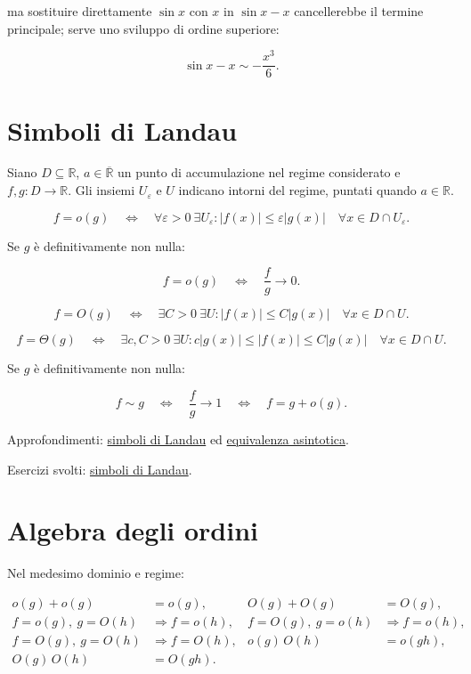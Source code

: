 ma sostituire direttamente \(\sin x\) con \(x\) in \(\sin x-x\) cancellerebbe il termine principale; serve uno sviluppo di ordine superiore:

\[
\sin x-x\sim-\frac{x^3}{6}.
\]

\section{Simboli di Landau}\label{simboli-di-landau}

Siano \(D\subseteq\mathbb R\), \(a\in\overline{\mathbb R}\) un punto di accumulazione nel regime considerato e \(f,g:D\to\mathbb R\). Gli insiemi \(U_\varepsilon\) e \(U\) indicano intorni del regime, puntati quando \(a\in\mathbb R\).

\[
\displaystyle
f=o(g)
\quad\Longleftrightarrow\quad
\forall\varepsilon>0\ \exists U_\varepsilon:
|f(x)|\le\varepsilon|g(x)|
\quad\forall x\in D\cap U_\varepsilon.
\]

Se \(g\) è definitivamente non nulla:

\[
\displaystyle
f=o(g)
\quad\Longleftrightarrow\quad
\frac{f}{g}\to0.
\]

\[
\displaystyle
f=O(g)
\quad\Longleftrightarrow\quad
\exists C>0\ \exists U:
|f(x)|\le C|g(x)|
\quad\forall x\in D\cap U.
\]

\[
\displaystyle
f=\Theta(g)
\quad\Longleftrightarrow\quad
\exists c,C>0\ \exists U:
c|g(x)|\le |f(x)|\le C|g(x)|
\quad\forall x\in D\cap U.
\]

Se \(g\) è definitivamente non nulla:

\[
\displaystyle
f\sim g
\quad\Longleftrightarrow\quad
\frac{f}{g}\to1
\quad\Longleftrightarrow\quad
f=g+o(g).
\]

Approfondimenti: \href{https://ingegnerismo.it/matematica/simboli-di-landau/}{simboli di Landau} ed \href{https://ingegnerismo.it/matematica/equivalenza-asintotica/}{equivalenza asintotica}.

Esercizi svolti: \href{https://ingegnerismo.it/matematica/simboli-di-landau-esercizi/}{simboli di Landau}.

\section{Algebra degli ordini}\label{algebra-degli-ordini}

Nel medesimo dominio e regime:

\[
\begin{aligned}
o(g)+o(g)&=o(g),&
O(g)+O(g)&=O(g),\\
f=o(g),\ g=O(h)&\Rightarrow f=o(h),&
f=O(g),\ g=o(h)&\Rightarrow f=o(h),\\
f=O(g),\ g=O(h)&\Rightarrow f=O(h),&
o(g)\,O(h)&=o(gh),\\
O(g)\,O(h)&=O(gh).&&
\end{aligned}
\]

